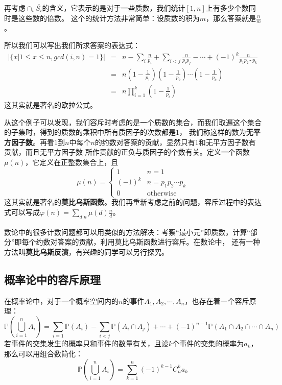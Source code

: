\documentclass{noithesis}
\theoremstyle{plain}      \newtheorem{theorem}{定理}[subsection]
\theoremstyle{definition} \newtheorem{problem}{问题}[subsection]
\begin{document}
再考虑$\cap_i{\overline{S_i}}$的含义，它表示的是对于一些质数，我们统计$[1,n]$上有多少个数同时是这些数的倍数。
这个的统计方法非常简单：设质数的积为$m$，那么答案就是$\frac{n}{m}$。 \par

所以我们可以写出我们所求答案的表达式：
\begin{eqnarray*}
|\{x | 1 \le x \le n, gcd(i, n)=1\}| & = & n - \sum_{i} \frac{n}{p_i} + \sum_{i < j} \frac{n}{p_ip_j}-\cdots +(-1)^k\frac{n}{p_1p_2 \cdots p_k} \\
                                     & = & n\left(1-\frac{1}{p_1}\right)\left(1-\frac{1}{p_2}\right)\cdots \left(1-\frac{1}{p_k}\right) \\
									 & = & n \prod_{i=1}^k \left(1 - \frac{1}{p_i}\right)
\end{eqnarray*}
这其实就是著名的欧拉公式。 \par

从这个例子可以发现，我们容斥时考虑的是一个质数的集合，而我们取遍这个集合的子集时，得到的质数的乘积中所有质因子的次数都是$1$，
我们称这样的数为\textbf{无平方因子数}。再看$1$到$n$中每个$n$的约数对答案的贡献，显然只有$1$和无平方因子数有贡献，而且无平方因子数
所作贡献的正负与质因子的个数有关。定义一个函数$\mu(n)$，它定义在正整数集合上，且
\[
\mu(n) = \left\{
	\begin{array}{ll}
		1 & n = 1 \\
		(-1)^k & n=p_1p_2 \cdots p_k \\
		0 & \mbox{otherwise}
	\end{array} \right.
\]
这其实就是著名的\textbf{莫比乌斯函数}。我们再重新考虑之前的问题，容斥过程中的表达式可以写成$\varphi(n) = \sum_{d|n} \mu(d) \frac{n}{d}$。 \par

数论中的很多计数问题都可以用类似的方法解决：考察“最小元”即质数，计算“部分”即每个约数对答案的贡献，利用莫比乌斯函数进行容斥。在数论中，
还有一种方法叫\textbf{莫比乌斯反演}，有兴趣的同学可以另行探究。

\subsection{概率论中的容斥原理}

在概率论中，对于一个概率空间内的$n$的事件$A_1,A_2,\cdots,A_n$，也存在着一个容斥原理：
\[
\mathbb{P}\left(\bigcup_{i=1}^n A_i \right) = \sum_{i=1} \mathbb{P}(A_i) - \sum_{i<j} \mathbb{P}(A_i \cap A_j) + \cdots + (-1)^{n-1} \mathbb{P}(A_1 \cap A_2 \cap \cdots \cap A_n)
\]
若事件的交集发生的概率只和事件的数量有关，且设$k$个事件的交集的概率为$a_k$，那么可以用组合数简化：
\[
\mathbb{P}\left(\bigcup_{i=1}^n A_i \right) = \sum_{k=1}^{n} (-1)^{k-1} C_n^k a_k
\]
\par
\end{document}
